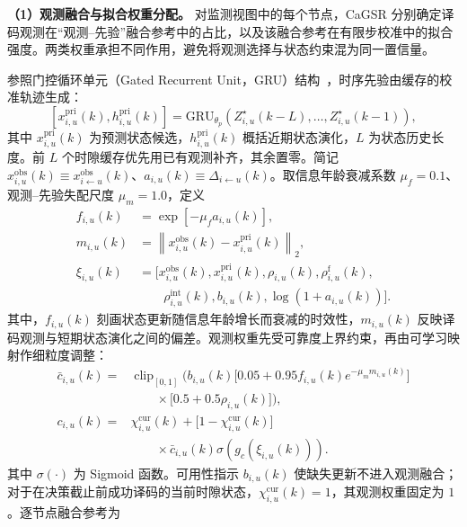 \textbf{（1）观测融合与拟合权重分配。} 对监测视图中的每个节点，CaGSR 分别确定译码观测在“观测--先验”融合参考中的占比，以及该融合参考在有限步校准中的拟合强度。两类权重承担不同作用，避免将观测选择与状态约束混为同一置信量。

参照门控循环单元（Gated Recurrent Unit，GRU）结构~\cite{cho-RNNEncoderDecoder-EMNLP14}，时序先验由缓存的校准轨迹生成：
\begin{equation}
\left[
x_{i,u}^{\mathrm{pri}}(k),
h_{i,u}^{\mathrm{pri}}(k)
\right]
=
\mathrm{GRU}_{\theta_p}
\left(
Z_{i,u}^{\star}(k-L),\ldots,Z_{i,u}^{\star}(k-1)
\right),
\label{eq:ch2_cagsr_prior}
\end{equation}
其中 $x_{i,u}^{\mathrm{pri}}(k)$ 为预测状态候选，$h_{i,u}^{\mathrm{pri}}(k)$ 概括近期状态演化，$L$ 为状态历史长度。前 $L$ 个时隙缓存优先用已有观测补齐，其余置零。简记 $x_{i,u}^{\mathrm{obs}}(k)\equiv x_{i\leftarrow u}^{\mathrm{obs}}(k)$、$a_{i,u}(k)\equiv\Delta_{i\leftarrow u}(k)$。取信息年龄衰减系数 $\mu_f=0.1$、观测--先验失配尺度 $\mu_m=1.0$，定义
\begin{equation}
\begin{aligned}
f_{i,u}(k)&=\exp\!\left[-\mu_f a_{i,u}(k)\right],\\
m_{i,u}(k)&=\left\|x_{i,u}^{\mathrm{obs}}(k)-x_{i,u}^{\mathrm{pri}}(k)\right\|_2,\\
\xi_{i,u}(k)&=\big[x_{i,u}^{\mathrm{obs}}(k),x_{i,u}^{\mathrm{pri}}(k),
\rho_{i,u}(k),\rho_{i,u}^{\mathrm f}(k),\\
&\qquad \rho_{i,u}^{\mathrm{int}}(k),b_{i,u}(k),
\log(1+a_{i,u}(k))\big].
\end{aligned}
\label{eq:ch2_cagsr_feature}
\end{equation}
其中，$f_{i,u}(k)$ 刻画状态更新随信息年龄增长而衰减的时效性，$m_{i,u}(k)$ 反映译码观测与短期状态演化之间的偏差。观测权重先受可靠度上界约束，再由可学习映射作细粒度调整：
\begin{equation}
\begin{aligned}
\bar c_{i,u}(k)
={}&\operatorname{clip}_{[0,1]}\!\Big(
b_{i,u}(k)\big[0.05+0.95f_{i,u}(k)e^{-\mu_m m_{i,u}(k)}\big]\\
&\qquad\times\big[0.5+0.5\rho_{i,u}(k)\big]\Big),\\
c_{i,u}(k)
={}&\chi_{i,u}^{\mathrm{cur}}(k)
+\big[1-\chi_{i,u}^{\mathrm{cur}}(k)\big]\\
&\qquad\times\bar c_{i,u}(k)\sigma\!\left(g_c(\xi_{i,u}(k))\right).
\end{aligned}
\label{eq:ch2_cagsr_weight}
\end{equation}
其中 $\sigma(\cdot)$ 为 Sigmoid 函数。可用性指示 $b_{i,u}(k)$ 使缺失更新不进入观测融合；对于在决策截止前成功译码的当前时隙状态，$\chi_{i,u}^{\mathrm{cur}}(k)=1$，其观测权重固定为 $1$。逐节点融合参考为
